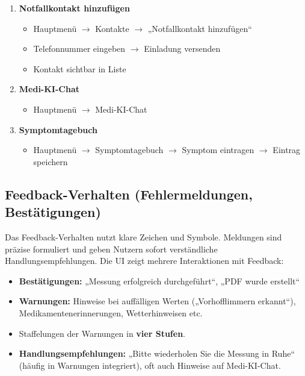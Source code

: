 \begin{enumerate}
	\item \textbf{Notfallkontakt hinzufügen}
	\begin{itemize}
		\item Hauptmenü $\rightarrow$ Kontakte $\rightarrow$ „Notfallkontakt hinzufügen“
		\item Telefonnummer eingeben $\rightarrow$ Einladung versenden
		\item Kontakt sichtbar in Liste
	\end{itemize}
	
	\item \textbf{Medi-KI-Chat}
	\begin{itemize}
		\item Hauptmenü $\rightarrow$ Medi-KI-Chat
	\end{itemize}
	
	\item \textbf{Symptomtagebuch}
	\begin{itemize}
		\item Hauptmenü $\rightarrow$ Symptomtagebuch $\rightarrow$ Symptom eintragen $\rightarrow$ Eintrag speichern
	\end{itemize}
\end{enumerate}

\subsection{Feedback-Verhalten (Fehlermeldungen, Bestätigungen)}
Das Feedback-Verhalten nutzt klare Zeichen und Symbole. Meldungen sind präzise formuliert und geben Nutzern sofort verständliche Handlungsempfehlungen. Die UI zeigt mehrere Interaktionen mit Feedback:
\begin{itemize}
	\item \textbf{Bestätigungen:} „Messung erfolgreich durchgeführt“, „PDF wurde erstellt“
	\item \textbf{Warnungen:} Hinweise bei auffälligen Werten („Vorhofflimmern erkannt“), Medikamentenerinnerungen, Wetterhinweisen etc.
	\item Staffelungen der Warnungen in \textbf{vier Stufen}.
	\item \textbf{Handlungsempfehlungen:} „Bitte wiederholen Sie die Messung in Ruhe“ (häufig in Warnungen integriert), oft auch Hinweise auf Medi-KI-Chat.
\end{itemize}
